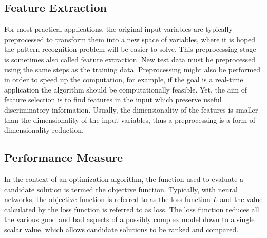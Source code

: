 \documentclass{scrartcl}
\begin{document}


\subsection{Feature Extraction}

For most practical applications, the original input variables are typically preprocessed to transform them into a new space of variables, where it is hoped the pattern recognition problem will be easier to solve. This preprocessing stage is sometimes also called feature extraction. New test data must be preprocessed using the same steps as the training data. Preprocessing might also be performed in order to speed up the computation, for example, if the goal is a real-time application the algorithm should be computationally feasible. Yet, the aim of feature selection is to find features in the input which preserve useful discriminatory information. Usually, the dimensionality of the features is smaller than the dimensionality of the input variables, thus a preprocessing is a form of dimensionality reduction. 




\subsection{Performance Measure}

In the context of an optimization algorithm, the function used to evaluate a candidate solution is termed the objective function. Typically, with neural networks, the objective function is referred to as the loss function $L$ and the value calculated by the loss function is referred to as loss. The loss function reduces all the various good and bad aspects of a possibly complex model down to a single scalar value, which allows candidate solutions to be ranked and compared.
\end{document}
